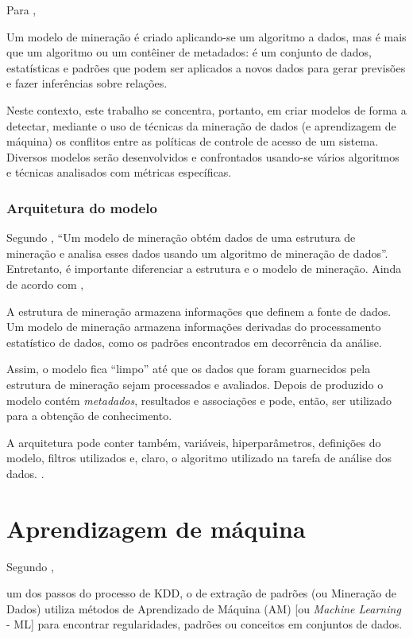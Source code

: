 Para , \begin{citacao}
	Um modelo de mineração é criado aplicando-se um algoritmo a dados, mas é mais que um algoritmo ou um contêiner de metadados: é um conjunto de dados, estatísticas e padrões que podem ser aplicados a novos dados para gerar previsões e fazer inferências sobre relações.
\end{citacao}

Neste contexto, este trabalho se concentra, portanto, em criar modelos de forma a detectar, mediante o uso de técnicas da mineração de dados (e aprendizagem de máquina) os conflitos entre as políticas de controle de acesso de um sistema. Diversos modelos serão desenvolvidos e confrontados usando-se vários algoritmos e técnicas analisados com métricas específicas.

\subsubsection{Arquitetura do modelo}\label{arquitetura_modelo}

Segundo , ``Um modelo de mineração obtém dados de uma estrutura de mineração e analisa esses dados usando um algoritmo de mineração de dados''. Entretanto, é importante diferenciar a estrutura e o modelo de mineração. Ainda de acordo com , \begin{citacao}
	A estrutura de mineração armazena informações que definem a fonte de dados. Um modelo de mineração armazena informações derivadas do processamento estatístico de dados, como os padrões encontrados em decorrência da análise.
\end{citacao}

Assim, o modelo fica ``limpo'' até que os dados que foram guarnecidos pela estrutura de mineração sejam processados e avaliados. Depois de produzido o modelo contém \textit{metadados}, resultados e associações e pode, então, ser utilizado para a obtenção de conhecimento.

A arquitetura pode conter também, variáveis, hiperparâmetros, definições do modelo, filtros utilizados e, claro, o algoritmo utilizado na tarefa de análise dos dados. \cite{deep_learning_book_2019}.

\section{Aprendizagem de máquina} \label{aprendizagem_maquina}
Segundo , \begin{citacao}
	um dos passos do processo de KDD, o de extração de padrões (ou Mineração de Dados) utiliza métodos de Aprendizado de Máquina (AM) [ou \textit{Machine Learning} - ML] para encontrar regularidades, padrões ou conceitos em conjuntos de dados.
\end{citacao}

